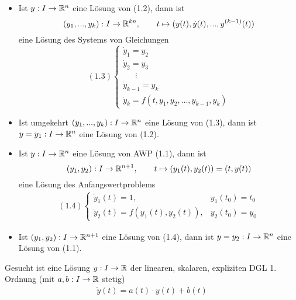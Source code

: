 \documentclass{cheat-sheet}
\begin{document}
\begin{satz}
  \begin{itemize}
    \item Ist $y : I \to \mathbb{R}^n$ eine Lösung von (1.2), dann ist
    \[
      (y_1, ..., y_k) : I \to \mathbb{R}^{kn},\qquad
      t \mapsto (y(t), \dot{y}(t), ..., y^{(k-1)}(t))
    \]
    eine Lösung des Systems von Gleichungen
    \[
      (1.3) \left\{ \begin{array}{ll}
      \dot{y}_1 = y_2\\
      \dot{y}_2 = y_3\\
      \quad\enspace\vdots\\
      \dot{y}_{k-1} = y_k\\
      \dot{y}_k = f(t, y_1, y_2, ..., y_{k-1}, y_k)
      \end{array} \right.
    \]
    \item Ist umgekehrt $(y_1, ..., y_k) : I \to \mathbb{R}^n$ eine Lösung von (1.3), dann ist $y = y_1 : I \to \mathbb{R}^n$ eine Lösung von (1.2).
  \end{itemize}
\end{satz}

\begin{satz}
  \begin{itemize}
    \item Ist $y : I \to \mathbb{R}^n$ eine Lösung von AWP (1.1), dann ist
    \[
      (y_1, y_2) : I \to \mathbb{R}^{n+1},\qquad
      t \mapsto (y_1(t), y_2(t)) = (t, y(t))
    \]
    eine Lösung des Anfangswertproblems
    \begin{align*}
      (1.4) \left\{ \begin{array}{ll}
        \dot{y}_1(t) = 1, & y_1(t_0) = t_0\\
        \dot{y}_2(t) = f(y_1(t), y_2(t)), & y_2(t_0) = y_0
      \end{array} \right.
    \end{align*}
    \item Ist $(y_1, y_2) : I \to \mathbb{R}^{n+1}$ eine Lösung von (1.4), dann ist $y = y_2 : I \to \mathbb{R}^n$ eine Lösung von (1.1).
  \end{itemize}
\end{satz}



\begin{prob}
  Gesucht ist eine Lösung $y : I \to \mathbb{R}$ der linearen, skalaren, expliziten DGL 1. Ordnung (mit $a, b : I \to \mathbb{R}$ stetig)
  \begin{align*}
    \dot{y}(t) = a(t) \cdot y(t) + b(t) \tag{1.5}
  \end{align*}
\end{prob}
\end{document}

